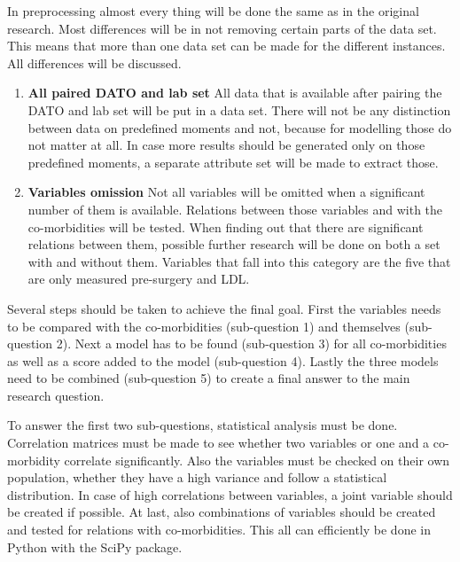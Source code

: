 \documentclass[10pt,a4paper]{report}
\begin{document}
	In preprocessing almost every thing will be done the same as in the original research. Most differences will be in not removing certain parts of the data set. This means that more than one data set can be made for the different instances. All differences will be discussed.
	
	\begin{enumerate}
		\item \textbf{All paired DATO and lab set} All data that is available after pairing the DATO and lab set will be put in a data set. There will not be any distinction between data on predefined moments and not, because for modelling those do not matter at all. In case more results should be generated only on those predefined moments, a separate attribute set will be made to extract those.
		
		\item \textbf{Variables omission} Not all variables will be omitted when a significant number of them is available. Relations between those variables and with the co-morbidities will be tested. When finding out that there are significant relations between them, possible further research will be done on both a set with and without them. Variables that fall into this category are the five that are only measured pre-surgery and LDL.
		
	\end{enumerate}
	
	Several steps should be taken to achieve the final goal. First the variables needs to be compared with the co-morbidities (sub-question 1) and themselves (sub-question 2). Next a model has to be found (sub-question 3) for all co-morbidities as well as a score added to the model (sub-question 4). Lastly the three models need to be combined (sub-question 5) to create a final answer to the main research question.
	
	To answer the first two sub-questions, statistical analysis must be done. Correlation matrices must be made to see whether two variables or one and a co-morbidity correlate significantly. Also the variables must be checked on their own population, whether they have a high variance and follow a statistical distribution. In case of high correlations between variables, a joint variable should be created if possible. At last, also combinations of variables should be created and tested for relations with co-morbidities. This all can efficiently be done in Python with the SciPy package.
	
\end{document}
